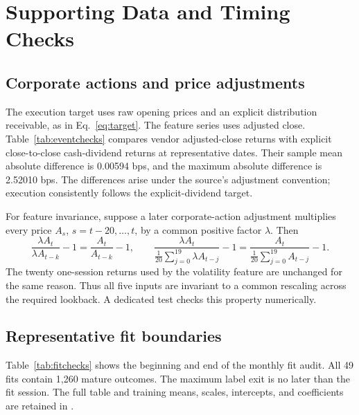 \section{Supporting Data and Timing Checks}
\label{app:audit}
\subsection{Corporate actions and price adjustments}
The execution target uses raw opening prices and an explicit distribution receivable, as in Eq.~\eqref{eq:target}. The feature series uses adjusted close. Table~\ref{tab:eventchecks} compares vendor adjusted-close returns with explicit close-to-close cash-dividend returns at representative dates. Their sample mean absolute difference is 0.00594 bps, and the maximum absolute difference is 2.52010 bps. The differences arise under the source's adjustment convention; execution consistently follows the explicit-dividend target.

\begin{table}[!htbp]
\centering\small
\caption{Representative dividend checks from the recorded snapshot.}
\label{tab:eventchecks}

\end{table}

For feature invariance, suppose a later corporate-action adjustment multiplies every price $A_s$, $s=t-20,\ldots,t$, by a common positive factor $\lambda$. Then
\begin{equation}
\frac{\lambda A_t}{\lambda A_{t-k}}-1=\frac{A_t}{A_{t-k}}-1,\qquad
\frac{\lambda A_t}{\frac1{20}\sum_{j=0}^{19}\lambda A_{t-j}}-1
=\frac{A_t}{\frac1{20}\sum_{j=0}^{19}A_{t-j}}-1.
\end{equation}
The twenty one-session returns used by the volatility feature are unchanged for the same reason. Thus all five inputs are invariant to a common rescaling across the required lookback. A dedicated test checks this property numerically.

\subsection{Representative fit boundaries}
Table~\ref{tab:fitchecks} shows the beginning and end of the monthly fit audit. All 49 fits contain 1,260 mature outcomes. The maximum label exit is no later than the fit session. The full table and training means, scales, intercepts, and coefficients are retained in .

